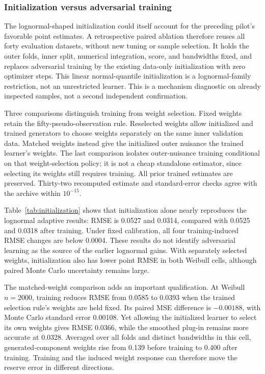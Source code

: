 \subsubsection{Initialization versus adversarial training}
\label{sec:initialization-ablation}

The lognormal-shaped initialization could itself account for the preceding
pilot's favorable point estimates. A retrospective paired ablation therefore
reuses all forty evaluation datasets, without new tuning or sample selection.
It holds the outer folds, inner split, numerical integration, score, and
bandwidths fixed, and replaces adversarial training by the existing data-only
initialization with zero optimizer steps. This linear normal-quantile
initialization is a lognormal-family restriction, not an unrestricted learner.
This is a mechanism diagnostic on already inspected samples, not a second
independent confirmation.

Three comparisons distinguish training from weight selection. Fixed weights
retain the fifty-pseudo-observation rule. Reselected weights allow initialized
and trained generators to choose weights separately on the same inner
validation data. Matched weights instead give the initialized outer nuisance
the trained learner's weights. The last comparison isolates outer-nuisance
training conditional on that weight-selection policy; it is not a cheap
standalone estimator, since selecting its weights still requires training.
All prior trained estimates are preserved. Thirty-two recomputed estimate
and standard-error checks agree with the archive within $10^{-15}$.

Table~\ref{tab:initialization} shows that initialization alone nearly
reproduces the lognormal adaptive results: RMSE is 0.0527 and 0.0314,
compared with 0.0525 and 0.0318 after training. Under fixed calibration, all
four training-induced RMSE changes are below 0.0004. These results do not
identify adversarial learning as the source of the earlier lognormal gains.
With separately selected weights, initialization also has lower point RMSE
in both Weibull cells, although paired Monte Carlo uncertainty remains large.

The matched-weight comparison adds an important qualification. At Weibull
$n=2000$, training reduces RMSE from 0.0585 to 0.0393 when the trained
selection rule's weights are held fixed. Its paired MSE difference is
$-0.00188$, with Monte Carlo standard error 0.00108. Yet allowing the
initialized learner to select its own weights gives RMSE 0.0366, while the
smoothed plug-in remains more accurate at 0.0328. Averaged over all folds and
distinct bandwidths in this cell, generated-component weights rise from
0.139 before training to 0.400 after training. Training and the induced
weight response can therefore move the reserve error in different directions.

